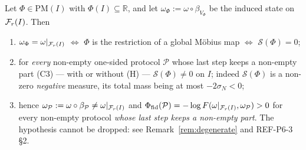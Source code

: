\documentclass[11pt]{article}
\newcommand{\Sch}{\mathcal S}
\newcommand{\Fr}{\cF_r}
\newcommand{\PP}{\mathcal P}
\theoremstyle{definition}\newtheorem{example}[theorem]{Example}
\begin{document}
\begin{theorem}\label{thm:rigidity}
Let $\Phi\in\mathrm{PM}(I)$ with $\Phi(I)\subseteq\mathbb R$, and let
$\omega_\Phi:=\omega\circ\beta_{V_\Phi}$ be the induced state on $\Fr(I)$.  Then
\begin{enumerate}[label=(\arabic*),leftmargin=2.2em]
\item $\omega_\Phi=\omega|_{\Fr(I)}$ $\iff$ $\Phi$ is the restriction of a global M\"obius map
 $\iff$ $\Sch(\Phi)=0$;
\item for \emph{every} non-empty one-sided protocol $\PP$ whose last step keeps a non-empty part
 (C3) --- with or without (H) --- $\Sch(\Phi)\ne0$ on $I$; indeed $\Sch(\Phi)$ is a non-zero
 \emph{negative} measure, its total mass being at most $-2\sigma_N<0$;
\item hence $\omega_\PP:=\omega\circ\beta_\PP\ne\omega|_{\Fr(I)}$ and
 $\Phi_{\rm fid}(\PP)=-\log F(\omega|_{\Fr(I)},\omega_\PP)>0$ for every non-empty protocol
 \emph{whose last step keeps a non-empty part}.  The hypothesis cannot be dropped: see
 Remark~\ref{rem:degenerate} and REF-P6-3 \S2.
\end{enumerate}
\end{theorem}
\end{document}
